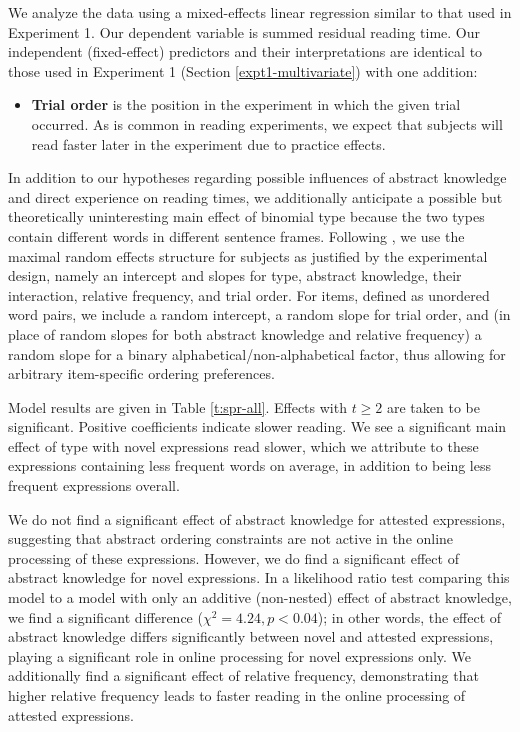 \documentclass[authoryear]{elsarticle}
\begin{document}
We analyze the data using a mixed-effects linear regression similar to that used in Experiment 1. Our dependent variable is summed residual reading time. Our independent (fixed-effect) predictors and their interpretations are identical to those used in Experiment 1 (Section \ref{expt1-multivariate}) with one addition:
%
\begin{itemize}
  \item \textbf{Trial order} is the position in the experiment in which the given trial occurred. As is common in reading experiments, we expect that subjects will read faster later in the experiment due to practice effects.
\end{itemize}
%
In addition to our hypotheses regarding possible influences of abstract knowledge and direct experience on reading times, we additionally anticipate a possible but theoretically uninteresting main effect of binomial type because the two types contain different words in different sentence frames. Following \citet{Barr:2013vf}, we use the maximal random effects structure for subjects as justified by the experimental design, namely an intercept and slopes for type, abstract knowledge, their interaction, relative frequency, and trial order. For items, defined as unordered word pairs, we include a random intercept, a random slope for trial order, and (in place of random slopes for both abstract knowledge and relative frequency) a random slope for a binary alphabetical/non-alphabetical factor, thus allowing for arbitrary item-specific ordering preferences.


Model results are given in Table \ref{t:spr-all}. Effects with $t\ge 2$ are taken to be significant. Positive coefficients indicate slower reading. We see a significant main effect of type with novel expressions read slower, which we attribute to these expressions containing less frequent words on average, in addition to being less frequent expressions overall.

We do not find a significant effect of abstract knowledge for attested expressions, suggesting that abstract ordering constraints are not active in the online processing of these expressions. However, we do find a significant effect of abstract knowledge for novel expressions. In a likelihood ratio test comparing this model to a model with only an additive (non-nested) effect of abstract knowledge, we find a significant difference ($\chi^{2}=4.24, p<0.04$); in other words, the effect of abstract knowledge differs significantly between novel and attested expressions, playing a significant role in online processing for novel expressions only.
We additionally find a significant effect of relative frequency, demonstrating that higher relative frequency leads to faster reading in the online processing of attested expressions. 
\end{document}
